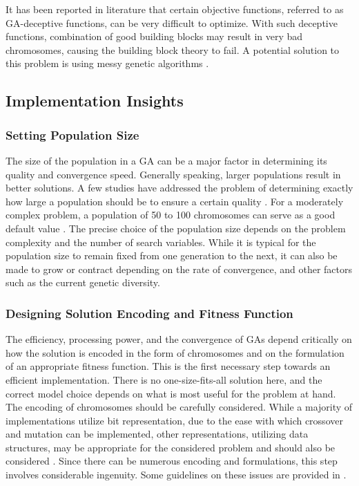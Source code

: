 \documentclass[journal]{IEEEtran}
\begin{document}
It has been reported in literature that certain objective functions, referred to as GA-deceptive functions, can be very difficult to optimize. With such deceptive functions, combination of good building blocks may result in very bad chromosomes, causing the building block theory to fail. A potential solution to this problem is using messy genetic algorithms \cite{mitchell1998introduction}.

\subsection{Implementation Insights}
\label{sec:insights}

\vspace{2mm}
\subsubsection{Setting Population Size}

The size of the population in a GA can be a major factor in determining its quality and convergence speed. Generally speaking, larger populations result in better solutions.  A few studies have addressed the problem of determining exactly how large a population should be to ensure a certain quality \cite{goldberg1989sizing}\cite{goldberg1991genetic} \cite{harik1999gambler}. For a moderately complex problem, a population of 50 to 100 chromosomes can serve as a good default value \cite{cox2005fuzzy}. The precise choice of the population size depends on the problem complexity and the number of search variables. While it is typical for the population size to remain fixed from one generation to the next, it can also be made to grow or contract depending on the rate of convergence, and other factors such as the current genetic diversity.  

\vspace{2mm}
\subsubsection{Designing Solution Encoding and Fitness Function}

The efficiency, processing power, and the convergence of GAs depend critically on how the solution is encoded in the form of chromosomes and on the formulation of an appropriate fitness function. This is the first necessary step towards an efficient implementation. There is no one-size-fits-all solution here, and the correct model choice depends on what is most useful for the problem at hand. The encoding of chromosomes should be carefully considered. While a majority of implementations utilize bit representation, due to the ease with which crossover and mutation can be implemented, other representations, utilizing data structures, may be appropriate for the considered problem and should also be considered \cite{sastry2005genetic}. Since there can be numerous encoding and formulations, this step involves considerable ingenuity. Some guidelines on these issues are provided in \cite{grefenstette1986optimization} \cite{de1991analysis}.
\end{document}
